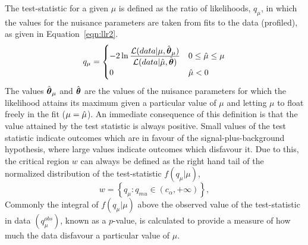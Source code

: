 The test-statistic for a given $\mu$ is defined as the ratio 
of likelihoods, $q_{\mu}$, in which the values for the nuisance parameters are taken from fits to the data (profiled), 
as given in Equation~\ref{eqn:llr2}. 
\begin{equation}
q_{\mu} = 
	\begin {cases} 
	-2\ln\frac{\displaystyle \mathcal{L}(data | \mu,\hat{{\boldsymbol{\theta}}}_{\mu})}
	{\displaystyle \mathcal{L}(data | \hat{\mu},\hat{{\boldsymbol{\theta}}})} 
		&  0 \le \hat{\mu} \le \mu \\
	 0 	&  \hat{\mu} < 0
	\end{cases}
\label{eqn:llr2}
\end{equation}
The values $\hat{{\boldsymbol{\theta}}}_{\mu}$ and $\hat{{\boldsymbol{\theta}}}$ are the values of 
the nuisance parameters for which the likelihood attains its maximum 
given a particular value of $\mu$ and letting $\mu$ to float freely in the 
fit ($\mu=\hat{\mu}$).
An immediate consequence of this definition is that the value attained
by the test statistic is always positive. Small values of the test
statistic indicate outcomes which are in favour of the signal-plus-background 
hypothesis, where large values indicate outcomes which disfavour it.
Due to this, the critical region $w$ can always be defined as the right
hand tail of the normalized distribution of the test-statistic $f(q_{\mu}|\mu)$, 
\begin{equation}
w = \left\{ q_{\mu} : q_{mu} \in (c_{\alpha},+\infty) \right\},
\end{equation}
Commonly the integral of $f(q_{\mu}|\mu)$ above the observed value of the 
test-statistic in data $(q_{\mu}^{obs})$, known as a $p$-value, is calculated
to provide a measure of how much the data disfavour a particular value of $\mu$. 

